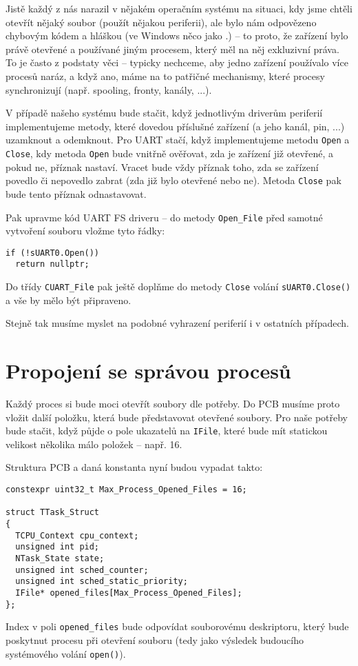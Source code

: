 \documentclass{article}
\begin{document}
Jistě každý z nás narazil v nějakém  operačním systému na situaci, kdy jsme chtěli otevřít nějaký soubor (použít nějakou periferii), ale bylo nám odpovězeno chybovým kódem a hláškou  (ve Windows něco jako .) -- to proto, že zařízení bylo právě otevřené a používané jiným procesem, který měl na něj exkluzivní práva. To je často z podstaty věci -- typicky nechceme, aby jedno zařízení používalo více procesů naráz, a když ano, máme na to patřičné mechanismy, které procesy synchronizují (např. spooling, fronty, kanály, ...).

V případě našeho systému bude stačit, když jednotlivým driverům periferií implementujeme metody, které dovedou příslušné zařízení (a jeho kanál, pin, ...) uzamknout a odemknout. Pro UART stačí, když implementujeme metodu \texttt{Open} a \texttt{Close}, kdy metoda \texttt{Open} bude vnitřně ověřovat, zda je zařízení již otevřené, a pokud ne, příznak nastaví. Vracet bude vždy příznak toho, zda se zařízení povedlo či nepovedlo zabrat (zda již bylo otevřené nebo ne). Metoda \texttt{Close} pak bude tento příznak odnastavovat.

Pak upravme kód UART FS driveru -- do metody \texttt{Open\_File} před samotné vytvoření souboru vložme tyto řádky:
\begin{lstlisting}
if (!sUART0.Open())
  return nullptr;
\end{lstlisting}
Do třídy \texttt{CUART\_File} pak ještě doplňme do metody \texttt{Close} volání \texttt{sUART0.Close()} a vše by mělo být připraveno.

Stejně tak musíme myslet na podobné vyhrazení periferií i v ostatních případech.

\section{Propojení se správou procesů}

Každý proces si bude moci otevřít soubory dle potřeby. Do PCB musíme proto vložit další položku, která bude představovat otevřené soubory. Pro naše potřeby bude stačit, když půjde o pole ukazatelů na \texttt{IFile}, které bude mít statickou velikost několika málo položek -- např. 16.

Struktura PCB a daná konstanta nyní budou vypadat takto:
\begin{lstlisting}
constexpr uint32_t Max_Process_Opened_Files = 16;

struct TTask_Struct
{
  TCPU_Context cpu_context;
  unsigned int pid;
  NTask_State state;
  unsigned int sched_counter;
  unsigned int sched_static_priority;
  IFile* opened_files[Max_Process_Opened_Files];
};
\end{lstlisting}
Index v poli \texttt{opened\_files} bude odpovídat souborovému deskriptoru, který bude poskytnut procesu při otevření souboru (tedy jako výsledek budoucího systémového volání \texttt{open()}).
\end{document}
